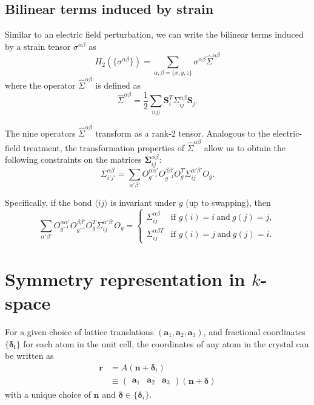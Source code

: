 \documentclass[12pt, a4paper]{article}
\newcommand{\mat}[1]{\bm{\mathit{#1}}}
\begin{document}
\subsection{Bilinear terms induced by strain}
Similar to an electric field perturbation, we can write the bilinear terms induced by a strain tensor $\sigma^{\alpha \beta}$ as
\begin{equation}
  H_2(\{\sigma^{\alpha\beta}\})=\sum_{\alpha,\beta=\{x,y,z\}}\sigma^{\alpha\beta}\hat{\Sigma}^{\alpha\beta}
\end{equation}
where the operator $\hat{\Sigma}^{\alpha\beta}$ is defined as
\begin{equation}
   \hat{\Sigma}^{\alpha\beta}= \frac{1}{2}\sum_{\langle ij\rangle}\bm{S}_i^T \mat{\Sigma}^{\alpha\beta}_{ij}\bm{S}_j.
\end{equation}

The nine operators $\hat{\Sigma}^{\alpha\beta}$ transform as a rank-2 tensor. Analogous to the electric-field treatment, the transformation properties of $\hat{\Sigma}^{\alpha\beta}$ allow us to obtain the following constraints on the matrices $\bm{\Sigma}_{ij}^{\alpha\beta}$:
\begin{equation}
  \mat{\Sigma}_{i'j'}^{\alpha\beta}=\sum_{\alpha'\beta'}O_{g^{-1}}^{\alpha\alpha'}O_{g^{-1}}^{\beta\beta'}\mat{O}_g^T \mat{\Sigma}^{\alpha'\beta'}_{ij}\mat{O}_g.
\end{equation}

Specifically, if the bond $\langle ij\rangle$ is invariant under $g$ (up to swapping), then
\begin{equation}
 \sum_{\alpha'\beta'}O_{g^{-1}}^{\alpha\alpha'}O_{g^{-1}}^{\beta\beta'}\mat{O}_g^T \mat{\Sigma}^{\alpha'\beta'}_{ij}\mat{O}_g= \begin{cases}
    \mat{\Sigma}_{ij}^{\alpha\beta}&\textrm{if }g(i)=i~\textrm{and}~g(j)=j,\\
    \mat{\Sigma}_{ij}^{\alpha \beta T}&\textrm{if }g(i)=j~\textrm{and}~g(j)=i.
 \end{cases}
\end{equation}

\section{Symmetry representation in $k$-space}
For a given choice of lattice translations $(\bm{a}_1,\bm{a}_2,\bm{a}_3)$, and fractional coordinates $\{\bm{\delta_i}\}$ for each atom in the unit cell, the coordinates of any atom in the crystal can be written as
\begin{align*}
  \bm{r}&= A (\bm{n}+\bm{\delta}_i)\\
   &\equiv \begin{pmatrix}
  \bm{a}_1&\bm{a}_2&\bm{a}_3
  \end{pmatrix}
(\bm{n}+\bm{\delta})
\end{align*}
with a unique choice of $\bm{n}$ and $\bm{\delta}\in\{\bm{\delta}_i\}$.
\end{document}
